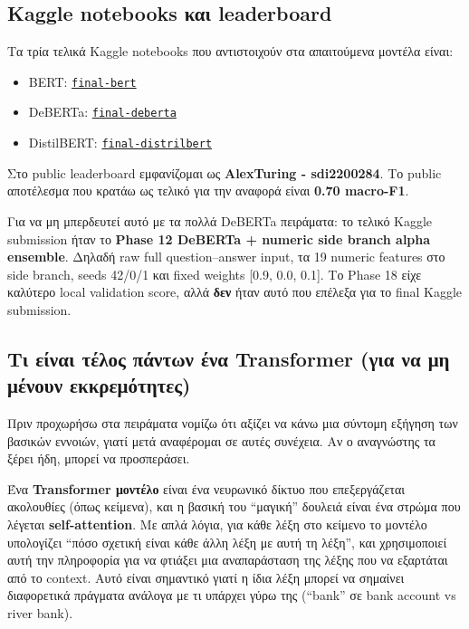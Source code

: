 \documentclass[12pt]{fphw}
\begin{document}
\subsection{Kaggle notebooks και leaderboard}

Τα τρία τελικά Kaggle notebooks που αντιστοιχούν στα απαιτούμενα μοντέλα είναι:

\begin{itemize}
    \item BERT: \href{https://www.kaggle.com/code/sdi2200284/final-bert}{\texttt{final-bert}}
    \item DeBERTa: \href{https://www.kaggle.com/code/sdi2200284/final-deberta}{\texttt{final-deberta}}
    \item DistilBERT: \href{https://www.kaggle.com/code/sdi2200284/final-distrilbert/edit}{\texttt{final-distrilbert}}
\end{itemize}

Στο public leaderboard εμφανίζομαι ως \textbf{AlexTuring - sdi2200284}. Το public αποτέλεσμα που κρατάω ως τελικό για την αναφορά είναι \textbf{0.70 macro-F1}.

Για να μη μπερδευτεί αυτό με τα πολλά DeBERTa πειράματα: το τελικό Kaggle submission ήταν το \textbf{Phase 12 DeBERTa + numeric side branch alpha ensemble}. Δηλαδή raw full question--answer input, τα 19 numeric features στο side branch, seeds 42/0/1 και fixed weights [0.9, 0.0, 0.1]. Το Phase 18 είχε καλύτερο local validation score, αλλά \textbf{δεν} ήταν αυτό που επέλεξα για το final Kaggle submission.

\subsection{Τι είναι τέλος πάντων ένα Transformer (για να μη μένουν εκκρεμότητες)}

Πριν προχωρήσω στα πειράματα νομίζω ότι αξίζει να κάνω μια σύντομη εξήγηση των βασικών εννοιών, γιατί μετά αναφέρομαι σε αυτές συνέχεια. Αν ο αναγνώστης τα ξέρει ήδη, μπορεί να προσπεράσει.

Ένα \textbf{Transformer μοντέλο} είναι ένα νευρωνικό δίκτυο που επεξεργάζεται ακολουθίες (όπως κείμενα), και η βασική του ``μαγική'' δουλειά είναι ένα στρώμα που λέγεται \textbf{self-attention}. Με απλά λόγια, για κάθε λέξη στο κείμενο το μοντέλο υπολογίζει ``πόσο σχετική είναι κάθε άλλη λέξη με αυτή τη λέξη'', και χρησιμοποιεί αυτή την πληροφορία για να φτιάξει μια αναπαράσταση της λέξης που να εξαρτάται από το context. Αυτό είναι σημαντικό γιατί η ίδια λέξη μπορεί να σημαίνει διαφορετικά πράγματα ανάλογα με τι υπάρχει γύρω της (``bank'' σε bank account vs river bank).
\end{document}
